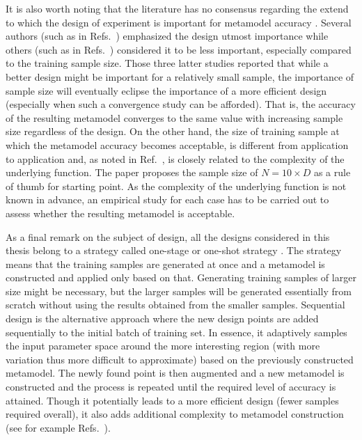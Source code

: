 It is also worth noting that the literature has no consensus regarding the extend to which the design of experiment is important for metamodel accuracy \cite{Viana2016}.
Several authors (such as in Refs.~\cite{Koehler1996,Jin2003,Damblin2013}) emphasized the design utmost importance while others (such as in Refs.~\cite{Simpson2001a,Liu2005,Chen2016}) considered it to be less important, especially compared to the training sample size. 
Those three latter studies reported that while a better design might be important for a relatively small sample, the importance of sample size will eventually eclipse the importance of a more efficient design (especially when such a convergence study can be afforded).
That is, the accuracy of the resulting metamodel converges to the same value with increasing sample size regardless of the design.
On the other hand, the size of training sample at which the metamodel accuracy becomes acceptable, is different from application to application and, as noted in Ref.~\cite{Loeppky2009}, is closely related to the complexity of the underlying function.
The paper proposes the sample size of $N = 10\times D$ as a rule of thumb for starting point.
As the complexity of the underlying function is not known in advance, an empirical study for each case has to be carried out to assess whether the resulting metamodel is acceptable.    

As a final remark on the subject of design,
all the designs considered in this thesis belong to a strategy called one-stage or one-shot strategy \cite{Kleijnen2007,Crombecq2011}.
The strategy means that the training samples are generated at once and a metamodel is constructed and applied only based on that.
Generating training samples of larger size might be necessary, but the larger samples will be generated essentially from scratch without using the results obtained from the smaller samples. 
Sequential design is the alternative approach where the new design points are added sequentially to the initial batch of training set.
In essence, it adaptively samples the input parameter space around the more interesting region (with more variation thus more difficult to approximate) based on the previously constructed metamodel.
The newly found point is then augmented and a new metamodel is constructed and the process is repeated until the required level of accuracy is attained.
Though it potentially leads to a more efficient design (fewer samples required overall), it also adds additional complexity to metamodel construction (see for example Refs.~\cite{Xiong2009,Crombecq2011}). 

